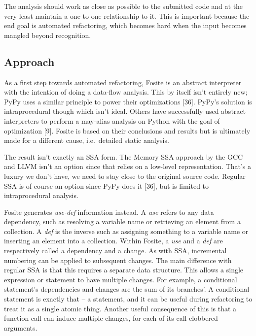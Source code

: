 \documentclass[]{article}
\begin{document}
The analysis should work as close as possible to the submitted code and
at the very least maintain a one-to-one relationship to it. This is
important because the end goal is automated refactoring, which becomes
hard when the input becomes mangled beyond recognition.

\subsection{Approach}\label{approach}

As a first step towards automated refactoring, Fosite is an abstract
interpreter with the intention of doing a data-flow analysis. This by
itself isn't entirely new; PyPy uses a similar principle to power their
optimizations {[}36{]}. PyPy's solution is intraprocedural though which
isn't ideal. Others have successfully used abstract interpreters to
perform a may-alias analysis on Python with the goal of optimization
{[}9{]}. Fosite is based on their conclusions and results but is
ultimately made for a different cause, i.e.~detailed static analysis.

The result isn't exactly an SSA form. The Memory SSA approach by the GCC
and LLVM isn't an option since that relies on a low-level
representation. That's a luxury we don't have, we need to stay close to
the original source code. Regular SSA is of course an option since PyPy
does it {[}36{]}, but is limited to intraprocedural analysis.

Fosite generates \emph{use-def} information instead. A \emph{use} refers
to any data dependency, such as resolving a variable name or retrieving
an element from a collection. A \emph{def} is the inverse such as
assigning something to a variable name or inserting an element into a
collection. Within Fosite, a \emph{use} and a \emph{def} are
respectively called a dependency and a change. As with SSA, incremental
numbering can be applied to subsequent changes. The main difference with
regular SSA is that this requires a separate data structure. This allows
a single expression or statement to have multiple changes. For example,
a conditional statement's dependencies and changes are the sum of its
branches'. A conditional statement is exactly that -- a statement, and
it can be useful during refactoring to treat it as a single atomic
thing. Another useful consequence of this is that a function call can
induce multiple changes, for each of its call clobbered arguments.
\end{document}
